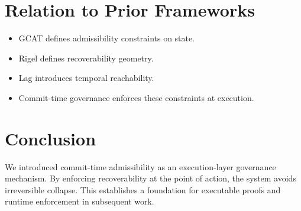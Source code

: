 \documentclass[letterpaper, 10 pt, conference]{ieeeconf}
\begin{document}
\section{Relation to Prior Frameworks}

\begin{itemize}
\item GCAT defines admissibility constraints on state.
\item Rigel defines recoverability geometry.
\item Lag introduces temporal reachability.
\item Commit-time governance enforces these constraints at execution.
\end{itemize}

\section{Conclusion}

We introduced commit-time admissibility as an execution-layer governance mechanism. By enforcing recoverability at the point of action, the system avoids irreversible collapse. This establishes a foundation for executable proofs and runtime enforcement in subsequent work.
\end{document}
